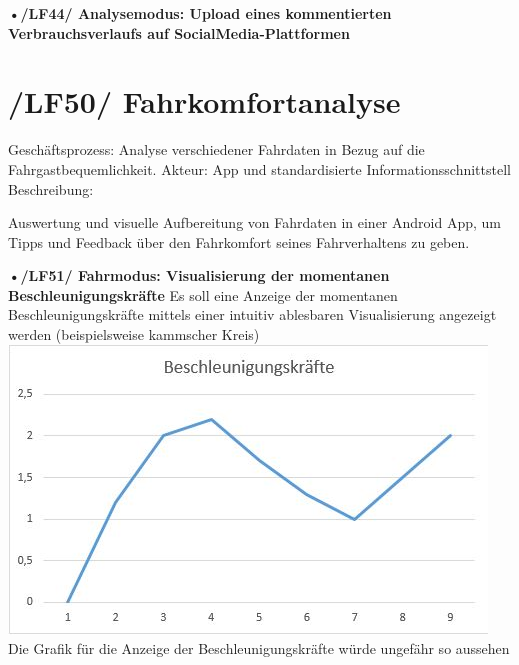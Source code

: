 \textbf{•/LF44/ Analysemodus: Upload eines kommentierten Verbrauchsverlaufs auf SocialMedia-Plattformen }

\section{/LF50/ Fahrkomfortanalyse}
Geschäftsprozess:	Analyse verschiedener Fahrdaten in Bezug auf die Fahrgastbequemlichkeit.
Akteur:			App und standardisierte Informationsschnittstell
Beschreibung:	

Auswertung und visuelle Aufbereitung von Fahrdaten in einer Android App, um Tipps und Feedback über den Fahrkomfort seines Fahrverhaltens zu geben.

\textbf{•/LF51/ Fahrmodus: Visualisierung der momentanen Beschleunigungskräfte}
Es soll eine Anzeige der momentanen Beschleunigungskräfte mittels einer intuitiv ablesbaren Visualisierung angezeigt werden (beispielsweise kammscher Kreis)
\nextline
\includegraphics{images/LF51_Beschleunigung.jpg}
\nextline
Die Grafik für die Anzeige der Beschleunigungskräfte würde ungefähr so aussehen

